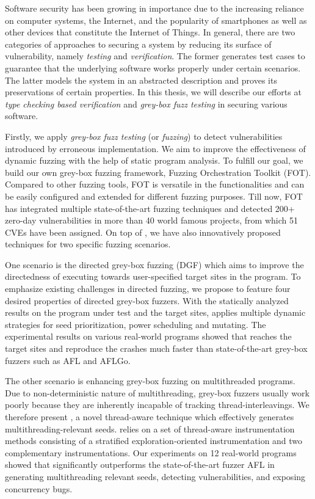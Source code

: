 Software security has been growing in importance due to the increasing reliance on computer systems, the Internet, and the popularity of smartphones as well as other devices that constitute the Internet of Things.
In general, there are two categories of approaches to securing a system by reducing its surface of vulnerability, namely \emph{testing} and \emph{verification}. The former
 generates test cases to guarantee that the underlying software works properly under certain scenarios.
 The latter models the system in an abstracted description and proves its preservations of certain properties.
  In this thesis, we will describe our efforts at \emph{type checking based verification} and \emph{grey-box fuzz testing} in securing various software.

Firstly, we apply \emph{grey-box fuzz testing} (or \emph{fuzzing}) to detect vulnerabilities introduced by erroneous implementation. We aim to improve the effectiveness of dynamic fuzzing with the help of static program analysis. To fulfill our goal, we build our own grey-box fuzzing framework, Fuzzing Orchestration Toolkit (FOT). Compared to other fuzzing tools, FOT is versatile in the functionalities and can be easily configured and extended for different fuzzing purposes. Till now, FOT has integrated multiple state-of-the-art fuzzing techniques and detected 200+ zero-day vulnerabilities in more than 40 world famous projects, from which 51 CVEs have been assigned.
On top of \FOT, we have also innovatively proposed techniques for two specific fuzzing scenarios.

One scenario is the directed grey-box fuzzing (DGF) which aims to improve the directedness of executing towards user-specified target sites in the program. To emphasize existing challenges in \mbox{directed} fuzzing, we propose \dFOT to feature four desired properties of directed grey-box fuzzers. With the statically analyzed results on the program under test and the target sites, \dFOT applies multiple dynamic strategies for seed prioritization, power scheduling and \mbox{mutating}.
The experimental results on various real-world \mbox{programs} showed that \dFOT reaches the target sites and reproduce the crashes much faster than state-of-the-art grey-box fuzzers such as AFL and AFLGo.

The other scenario is enhancing grey-box fuzzing on multithreaded programs. Due to non-deterministic nature of multithreading, grey-box fuzzers usually work poorly because they are inherently incapable of tracking thread-interleavings.
We therefore present \mtfuzz, a novel thread-aware technique which effectively generates multithreading-relevant seeds. \mtfuzz relies on a set of thread-aware instrumentation methods consisting of a stratified exploration-oriented instrumentation and two complementary instrumentations. Our experiments on 12 real-world programs showed that \mtfuzz significantly outperforms the state-of-the-art fuzzer AFL in generating multithreading relevant seeds, detecting vulnerabilities, and exposing concurrency bugs.

